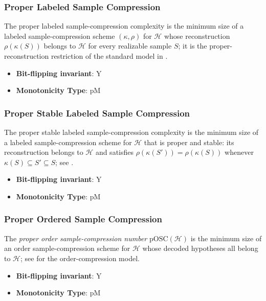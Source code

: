\subsubsection{Proper Labeled Sample Compression}
      
      \begin{definition}\label{def:proper_labeled_sample_compression}
      The proper labeled sample-compression complexity is the minimum size of a labeled sample-compression scheme $(\kappa,\rho)$ for $\mathcal H$ whose reconstruction $\rho(\kappa(S))$ belongs to $\mathcal H$ for every realizable sample $S$; it is the proper-reconstruction restriction of the standard model in \cite{FW1995}.
      \end{definition}
      \begin{itemize}
      \item {\bf Bit-flipping invariant}: Y
      \item {\bf Monotonicity Type}: pM
      \end{itemize}
\subsubsection{Proper Stable Labeled Sample Compression}
      
      \begin{definition}\label{def:proper_stable_labeled_sample_compression}
      The proper stable labeled sample-compression complexity is the minimum size of a labeled sample-compression scheme for $\mathcal H$ that is proper and stable: its reconstruction belongs to $\mathcal H$ and satisfies $\rho(\kappa(S'))=\rho(\kappa(S))$ whenever $\kappa(S)\subseteq S'\subseteq S$; see \cite{bousquet2020proper,hanneke2021stable}.
      \end{definition}
      \begin{itemize}
      \item {\bf Bit-flipping invariant}: Y
      \item {\bf Monotonicity Type}: pM
      \end{itemize}
\subsubsection{Proper Ordered Sample Compression}
      
      \begin{definition}\label{def:proper_ordered_sample_compression}
      The \emph{proper order sample-compression number} $\mathrm{pOSC}(\mathcal H)$
      is the minimum size of an order sample-compression scheme for
      $\mathcal H$ whose decoded hypotheses all belong to $\mathcal H$; see
      \cite{darnstadt2016order} for the order-compression model.
      \end{definition}
      \begin{itemize}
      \item {\bf Bit-flipping invariant}: Y
      \item {\bf Monotonicity Type}: pM
      \end{itemize}
